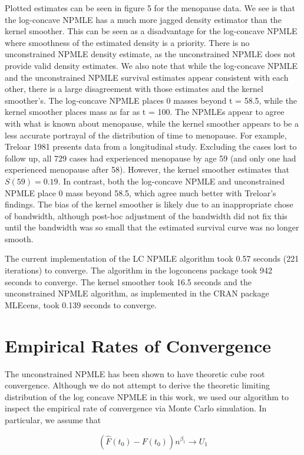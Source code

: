 \documentclass[10pt]{article}
\begin{document}
	Plotted estimates can be seen in figure 5 for the menopause data. We see is that the log-concave NPMLE has a much more jagged density estimator than the kernel smoother. This can be seen as a disadvantage for the log-concave NPMLE where smoothness of the estimated density is a priority. There is no unconstrained NPMLE density estimate, as the unconstrained NPMLE does not provide valid density estimates. We also note that while the log-concave NPMLE and the unconstrained NPMLE survival estimates appear consistent with each other, there is a large disagreement with those estimates and the kernel smoother's. The log-concave NPMLE places 0 masses beyond t = 58.5, while the kernel smoother places mass as far as t = 100. The NPMLEs appear to agree with what is known about menopause, while the kernel smoother appears to be a less accurate portrayal of the distribution of time to menopause. For example, Treloar 1981 presents data from a longitudinal study. Excluding the cases lost to follow up, all 729 cases had experienced menopause by age 59 (and only one had experienced menopause after 58). However, the kernel smoother estimates that $S(59) =  0.19$. In contrast, both the log-concave NPMLE and unconstrained NPMLE place 0 mass beyond 58.5, which agree much better with Treloar's findings. The bias of the kernel smoother is likely due to an inappropriate chose of bandwidth, although post-hoc adjustment of the bandwidth did not fix this until the bandwidth was so small that the estimated survival curve was no longer smooth. 
	
	 The current implementation of the LC NPMLE algorithm took 0.57 seconds (221 iterations) to converge. The algorithm in the logconcens package took 942 seconds to converge. The kernel smoother took 16.5 seconds and the unconstrained NPMLE algorithm, as implemented in the CRAN package  MLEcens, took 0.139 seconds to converge. 
	
	
	{\section{Empirical Rates of Convergence} } 
	
	The unconstrained NPMLE has been shown to have theoretic cube root convergence. Although we do not attempt to derive the theoretic limiting distribution of the log concave NPMLE in this work, we used our algorithm to inspect the empirical rate of convergence via Monte Carlo simulation. In particular, we assume that
	
	\[ ( \hat F (t_0) - F(t_0) ) n^{\beta_1} \rightarrow U_1 \]
	
\end{document}
